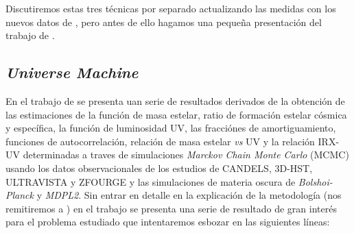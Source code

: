 Discutiremos estas tres técnicas por separado actualizando las medidas con los nuevos datos de \cite{behroozi2019universemachine}, pero antes de ello hagamos una pequeña presentación del trabajo de \cite{behroozi2019universemachine}.

\subsection{\textit{Universe Machine}}

En el trabajo de \cite{behroozi2019universemachine} se presenta uan serie de resultados derivados de la obtención de las estimaciones de la función de masa estelar, ratio de formación estelar cósmica y específica, la función de luminosidad UV, las fracciónes de amortiguamiento, funciones de autocorrelación, relación de masa estelar \textit{vs} UV y la relación IRX-UV determinadas a traves de simulaciones \textit{Marckov Chain Monte Carlo} (MCMC) usando los datos observacionales de los estudios de CANDELS, 3D-HST, ULTRAVISTA y ZFOURGE y las simulaciones de materia oscura de \textit{Bolshoi-Planck} y \textit{MDPL2}. Sin entrar en detalle en la explicación de la metodología (nos remitiremos a \cite{behroozi2019universemachine}) en el trabajo se presenta una serie de resultado de gran interés para el problema estudiado que intentaremos esbozar en las siguientes líneas:
